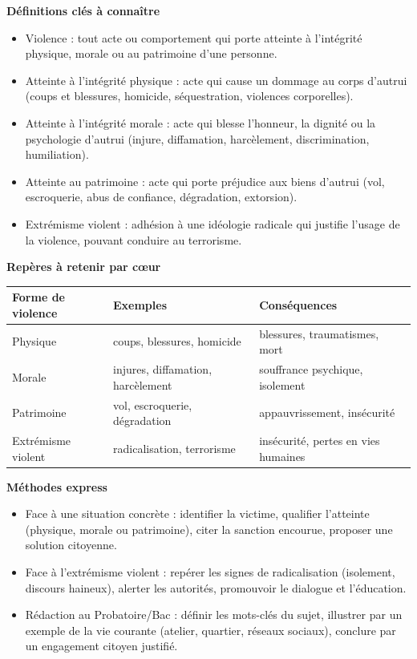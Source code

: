 \documentclass[11pt]{article}
\newcommand{\cle}[1]{{\popxbold\color{popdark}#1}}
\begin{document}
\begin{aretenir}
\textbf{Définitions clés à connaître}
\begin{itemize}
  \item \cle{Violence} : tout acte ou comportement qui porte atteinte à l'intégrité physique, morale ou au patrimoine d'une personne.
  \item \cle{Atteinte à l'intégrité physique} : acte qui cause un dommage au corps d'autrui (coups et blessures, homicide, séquestration, violences corporelles).
  \item \cle{Atteinte à l'intégrité morale} : acte qui blesse l'honneur, la dignité ou la psychologie d'autrui (injure, diffamation, harcèlement, discrimination, humiliation).
  \item \cle{Atteinte au patrimoine} : acte qui porte préjudice aux biens d'autrui (vol, escroquerie, abus de confiance, dégradation, extorsion).
  \item \cle{Extrémisme violent} : adhésion à une idéologie radicale qui justifie l'usage de la violence, pouvant conduire au terrorisme.
\end{itemize}

\textbf{Repères à retenir par cœur}
\begin{center}
\begin{tabularx}{\linewidth}{|l|X|X|}\hline
\rowcolor{popblueL} \textbf{Forme de violence} & \textbf{Exemples} & \textbf{Conséquences} \\ \hline
Physique & coups, blessures, homicide & blessures, traumatismes, mort \\ \hline
Morale & injures, diffamation, harcèlement & souffrance psychique, isolement \\ \hline
Patrimoine & vol, escroquerie, dégradation & appauvrissement, insécurité \\ \hline
Extrémisme violent & radicalisation, terrorisme & insécurité, pertes en vies humaines \\ \hline
\end{tabularx}
\end{center}

\textbf{Méthodes express}
\begin{itemize}
  \item Face à une situation concrète : identifier la victime, qualifier l'atteinte (physique, morale ou patrimoine), citer la sanction encourue, proposer une solution citoyenne.
  \item Face à l'extrémisme violent : repérer les signes de radicalisation (isolement, discours haineux), alerter les autorités, promouvoir le dialogue et l'éducation.
  \item Rédaction au Probatoire/Bac : définir les mots-clés du sujet, illustrer par un exemple de la vie courante (atelier, quartier, réseaux sociaux), conclure par un engagement citoyen justifié.
\end{itemize}
\end{aretenir}
\end{document}

